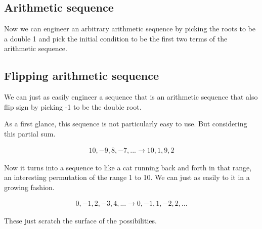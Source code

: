 \documentclass{article}
\begin{document}
\subsection*{Arithmetic sequence}
Now we can engineer an arbitrary arithmetic sequence by picking the roots to be a double 1 and pick the initial condition to be the first two terms of the arithmetic sequence.

\subsection*{Flipping arithmetic sequence}
We can just as easily engineer a sequence that is an arithmetic sequence that also flip sign by picking -1 to be the double root.

As a first glance, this sequence is not particularly easy to use. But considering this partial sum.

\begin{eqnarray*}
10,-9,8,-7,... \to 10,1,9,2
\end{eqnarray*}

Now it turns into a sequence to like a cat running back and forth in that range, an interesting permutation of the range 1 to 10. We can just as easily to it in a growing fashion.

\begin{eqnarray*}
0,-1,2,-3,4,... \to 0,-1,1,-2,2,...
\end{eqnarray*}

These just scratch the surface of the possibilities.
\end{document}
